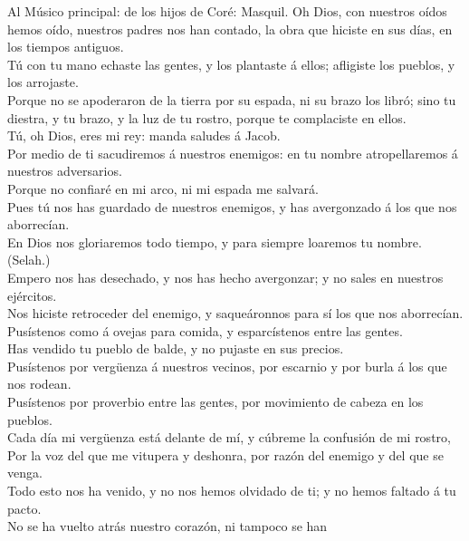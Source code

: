  Al Músico principal: de los hijos de Coré: Masquil. Oh
Dios, con nuestros oídos hemos oído, nuestros padres nos han contado, la
obra que hiciste en sus días, en los tiempos antiguos.\\
 Tú con tu mano echaste las gentes, y los plantaste á
ellos; afligiste los pueblos, y los arrojaste.\\
 Porque no se apoderaron de la tierra por su espada, ni su
brazo los libró; sino tu diestra, y tu brazo, y la luz de tu rostro,
porque te complaciste en ellos.\\
 Tú, oh Dios, eres mi rey: manda saludes á Jacob.\\
 Por medio de ti sacudiremos á nuestros enemigos: en tu
nombre atropellaremos á nuestros adversarios.\\
 Porque no confiaré en mi arco, ni mi espada me salvará.\\
 Pues tú nos has guardado de nuestros enemigos, y has
avergonzado á los que nos aborrecían.\\
 En Dios nos gloriaremos todo tiempo, y para siempre
loaremos tu nombre. (Selah.)\\
 Empero nos has desechado, y nos has hecho avergonzar; y
no sales en nuestros ejércitos.\\
 Nos hiciste retroceder del enemigo, y saqueáronnos para
sí los que nos aborrecían.\\
 Pusístenos como á ovejas para comida, y esparcístenos
entre las gentes.\\
 Has vendido tu pueblo de balde, y no pujaste en sus
precios.\\
 Pusístenos por vergüenza á nuestros vecinos, por
escarnio y por burla á los que nos rodean.\\
 Pusístenos por proverbio entre las gentes, por
movimiento de cabeza en los pueblos.\\
 Cada día mi vergüenza está delante de mí, y cúbreme la
confusión de mi rostro,\\
 Por la voz del que me vitupera y deshonra, por razón del
enemigo y del que se venga.\\
 Todo esto nos ha venido, y no nos hemos olvidado de ti;
y no hemos faltado á tu pacto.\\
 No se ha vuelto atrás nuestro corazón, ni tampoco se han
